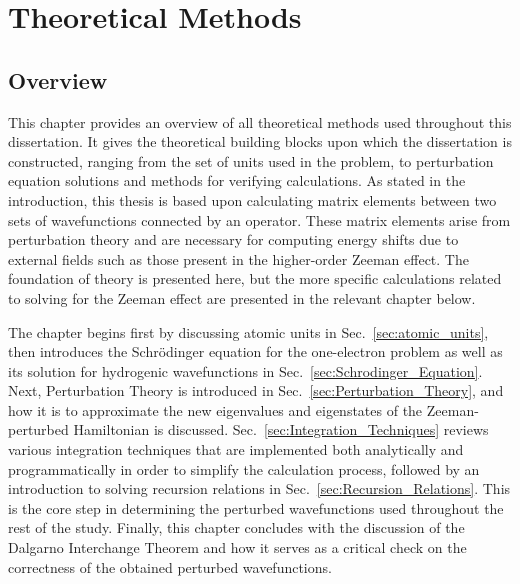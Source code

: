 \chapter{Theoretical Methods} \label{Theoretical_Methods}

\section{Overview}
        This chapter provides an overview of all theoretical methods used throughout this dissertation. It gives the theoretical building blocks upon which the dissertation is constructed, ranging from the set of units used in the problem, to perturbation equation solutions and methods for verifying calculations. As stated in the introduction, this thesis is based upon calculating matrix elements between two sets of wavefunctions connected by an operator. These matrix elements arise from perturbation theory and are necessary for computing energy shifts due to external fields such as those present in the higher-order Zeeman effect. The foundation of theory is presented here, but the more specific calculations related to solving for the Zeeman effect are presented in the relevant chapter below.

        The chapter begins first by discussing atomic units in Sec.~\ref{sec:atomic_units}, then introduces the Schrödinger equation for the one-electron problem as well as its solution for hydrogenic wavefunctions in Sec.~\ref{sec:Schrodinger_Equation}. Next, Perturbation Theory is introduced in Sec.~\ref{sec:Perturbation_Theory}, and how it is to approximate the new eigenvalues and eigenstates of the Zeeman-perturbed Hamiltonian is discussed. Sec.~\ref{sec:Integration_Techniques} reviews various integration techniques that are implemented both analytically and programmatically in order to simplify the calculation process, followed by an introduction to solving recursion relations in Sec.~\ref{sec:Recursion_Relations}. This is the core step in determining the perturbed wavefunctions used throughout the rest of the study. Finally, this chapter concludes with the discussion of the Dalgarno Interchange Theorem and how it serves as a critical check on the correctness of the obtained perturbed wavefunctions.

